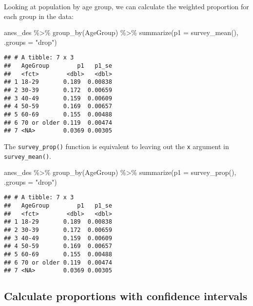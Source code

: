 \documentclass[
]{krantz}
\makeatletter
\newenvironment{Shaded}{\begin{snugshade}}{\end{snugshade}}
\newcommand{\AttributeTok}[1]{\textcolor[rgb]{0.61,0.61,0.61}{#1}}
\newcommand{\FunctionTok}[1]{\textcolor[rgb]{0,0,0}{#1}}
\newcommand{\NormalTok}[1]{#1}
\newcommand{\SpecialCharTok}[1]{\textcolor[rgb]{0,0,0}{#1}}
\newcommand{\StringTok}[1]{\textcolor[rgb]{0.5,0.5,0.5}{#1}}
\newenvironment{kframe}{%
\medskip{}
\setlength{\fboxsep}{.8em}
 \def\at@end@of@kframe{}%
 \ifinner\ifhmode%
  \def\at@end@of@kframe{\end{minipage}}%
  \begin{minipage}{\columnwidth}%
 \fi\fi%
 \def\FrameCommand##1{\hskip\@totalleftmargin \hskip-\fboxsep
 \colorbox{shadecolor}{##1}\hskip-\fboxsep
     \hskip-\linewidth \hskip-\@totalleftmargin \hskip\columnwidth}%
 \MakeFramed {\advance\hsize-\width
   \@totalleftmargin\z@ \linewidth\hsize
   \@setminipage}}%
 {\par\unskip\endMakeFramed%
 \at@end@of@kframe}
\renewenvironment{Shaded}{\begin{kframe}}{\end{kframe}}
\makeatother
\begin{document}
Looking at population by age group, we can calculate the weighted proportion for each group in the data:

\begin{Shaded}
\begin{Highlighting}[]
\NormalTok{anes\_des }\SpecialCharTok{\%\textgreater{}\%}
  \FunctionTok{group\_by}\NormalTok{(AgeGroup) }\SpecialCharTok{\%\textgreater{}\%}
  \FunctionTok{summarize}\NormalTok{(}\AttributeTok{p1 =} \FunctionTok{survey\_mean}\NormalTok{(),}
            \AttributeTok{.groups =} \StringTok{"drop"}\NormalTok{)}
\end{Highlighting}
\end{Shaded}

\begin{verbatim}
## # A tibble: 7 x 3
##   AgeGroup        p1   p1_se
##   <fct>        <dbl>   <dbl>
## 1 18-29       0.189  0.00838
## 2 30-39       0.172  0.00659
## 3 40-49       0.159  0.00609
## 4 50-59       0.169  0.00657
## 5 60-69       0.155  0.00488
## 6 70 or older 0.119  0.00474
## 7 <NA>        0.0369 0.00305
\end{verbatim}

The \texttt{survey\_prop()} function is equivalent to leaving out the \texttt{x} argument in \texttt{survey\_mean()}.

\begin{Shaded}
\begin{Highlighting}[]
\NormalTok{anes\_des }\SpecialCharTok{\%\textgreater{}\%}
  \FunctionTok{group\_by}\NormalTok{(AgeGroup) }\SpecialCharTok{\%\textgreater{}\%}
  \FunctionTok{summarize}\NormalTok{(}\AttributeTok{p1 =} \FunctionTok{survey\_prop}\NormalTok{(),}
            \AttributeTok{.groups =} \StringTok{"drop"}\NormalTok{)}
\end{Highlighting}
\end{Shaded}

\begin{verbatim}
## # A tibble: 7 x 3
##   AgeGroup        p1   p1_se
##   <fct>        <dbl>   <dbl>
## 1 18-29       0.189  0.00838
## 2 30-39       0.172  0.00659
## 3 40-49       0.159  0.00609
## 4 50-59       0.169  0.00657
## 5 60-69       0.155  0.00488
## 6 70 or older 0.119  0.00474
## 7 <NA>        0.0369 0.00305
\end{verbatim}

\hypertarget{calculate-proportions-with-confidence-intervals}{%
\subsection{Calculate proportions with confidence intervals}\label{calculate-proportions-with-confidence-intervals}}
\end{document}
